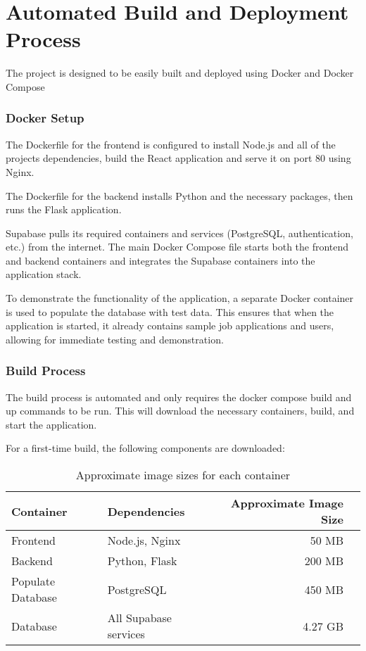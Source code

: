\documentclass[a4paper, 11pt]{article}
\begin{document}
\section{Automated Build and Deployment Process}
The project is designed to be easily built and deployed using Docker and Docker Compose

\subsubsection*{Docker Setup}
The Dockerfile for the frontend is configured to install Node.js and all of the projects dependencies, build the React application and serve it on port 80 using Nginx.

The Dockerfile for the backend installs Python and the necessary packages, then runs the Flask application. 

Supabase pulls its required containers and services (PostgreSQL, authentication, etc.) from the internet. The main Docker Compose file starts both the frontend and backend containers and integrates the Supabase containers into the application stack.

To demonstrate the functionality of the application, a separate Docker container is used to populate the database with test data. This ensures that when the application is started, it already contains sample job applications and users, allowing for immediate testing and demonstration.

\subsubsection*{Build Process}
The build process is automated and only requires the docker compose build and up commands to be run. This will download the necessary containers, build, and start the application.

For a first-time build, the following components are downloaded: 

\begin{table}[htbp]
    \newlength{\tableRowSpacing}
    \setlength{\tableRowSpacing}{3pt}   %

    \centering
    \begin{tabularx}{\textwidth}{XXrr}
    \toprule
    Container & Dependencies &  Approximate Image Size \\
    \midrule
    Frontend & Node.js, Nginx & 50 MB \\
    \addlinespace[\tableRowSpacing]
    Backend & Python, Flask & 200 MB \\
    \addlinespace[\tableRowSpacing]
    Populate Database &  PostgreSQL & 450 MB \\
    \addlinespace[\tableRowSpacing]
    Database & All Supabase services & 4.27 GB \\
    \end{tabularx}
    \caption{Approximate image sizes for each container }
\end{table}
\end{document}
